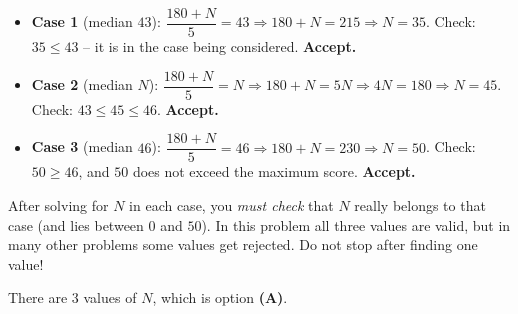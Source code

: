 {
\begin{itemize}[leftmargin=1.4em,itemsep=1pt]
\item \textbf{Case 1} (median $43$): $\dfrac{180+N}{5}=43\Rightarrow 180+N=215\Rightarrow N=35$. Check: $35\le 43$ -- it is in the case being considered. \textbf{Accept.}
\item \textbf{Case 2} (median $N$): $\dfrac{180+N}{5}=N\Rightarrow 180+N=5N\Rightarrow 4N=180\Rightarrow N=45$. Check: $43\le 45\le 46$. \textbf{Accept.}
\item \textbf{Case 3} (median $46$): $\dfrac{180+N}{5}=46\Rightarrow 180+N=230\Rightarrow N=50$. Check: $50\ge 46$, and $50$ does not exceed the maximum score. \textbf{Accept.}
\end{itemize}

\begin{warnbox}After solving for $N$ in each case, you \emph{must check} that $N$ really belongs to that case (and lies between $0$ and $50$). In this problem all three values are valid, but in many other problems some values get rejected. Do not stop after finding one value!\end{warnbox}

There are $3$ values of $N$, which is option \textbf{(A)}.
}
